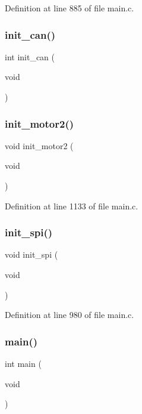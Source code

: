 Definition at line 885 of file main.\+c.

\mbox{\label{main_8c_aad4f63be2337fceef9105b9779301757}} 
\subsubsection{init\+\_\+can()}
{\footnotesize\ttfamily int init\+\_\+can (\begin{DoxyParamCaption}\item[{void}]{ }\end{DoxyParamCaption})}

\mbox{\label{main_8c_a170d70d06f2df59edff00ae0c23d6877}} 
\subsubsection{init\+\_\+motor2()}
{\footnotesize\ttfamily void init\+\_\+motor2 (\begin{DoxyParamCaption}\item[{void}]{ }\end{DoxyParamCaption})}



Definition at line 1133 of file main.\+c.

\mbox{\label{main_8c_a4454f968b2402a0e61deb15ab2571dab}} 
\subsubsection{init\+\_\+spi()}
{\footnotesize\ttfamily void init\+\_\+spi (\begin{DoxyParamCaption}\item[{void}]{ }\end{DoxyParamCaption})}



Definition at line 980 of file main.\+c.

\mbox{\label{main_8c_a840291bc02cba5474a4cb46a9b9566fe}} 
\subsubsection{main()}
{\footnotesize\ttfamily int main (\begin{DoxyParamCaption}\item[{void}]{ }\end{DoxyParamCaption})}




